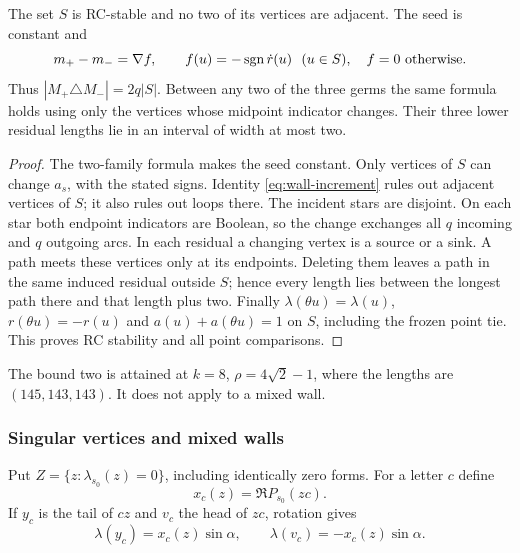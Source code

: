 \begin{theorem}\label{thm:regular-wall}
The set $S$ is RC-stable and no two of its vertices are adjacent.
The seed is constant and
\[
 m_+-m_-=\nabla f,\qquad
 f(u)=-\operatorname{sgn}\dot r(u)\ \ (u\in S),\quad f=0\ \text{otherwise}.
\]
Thus $|M_+\triangle M_-|=2q|S|$. Between any two of the three
germs the same formula holds using only the vertices whose midpoint
indicator changes. Their three lower residual lengths lie in an
interval of width at most two.
\end{theorem}
\begin{proof}
The two-family formula makes the seed constant. Only vertices of $S$
can change $a_s$, with the stated signs. Identity
\eqref{eq:wall-increment} rules out adjacent vertices of $S$; it also
rules out loops there. The incident stars are disjoint. On each star
both endpoint indicators are Boolean, so the change exchanges all
$q$ incoming and $q$ outgoing arcs. In each residual a changing
vertex is a source or a sink. A path meets these vertices only at
its endpoints. Deleting them leaves a path in the same induced
residual outside $S$; hence every length lies between the longest
path there and that length plus two. Finally
$\lambda(\theta u)=\lambda(u)$, $r(\theta u)=-r(u)$ and
$a(u)+a(\theta u)=1$ on $S$, including the frozen point tie.
This proves RC stability and all point comparisons.
\end{proof}
The bound two is attained at $k=8$, $\rho=4\sqrt2-1$, where the
lengths are $(145,143,143)$. It does not apply to a mixed wall.

\subsubsection{Singular vertices and mixed walls}
Put $Z=\{z:\lambda_{s_0}(z)=0\}$, including identically zero forms.
For a letter $c$ define
\[
 x_c(z)=\Re P_{s_0}(zc).
\]
If $y_c$ is the tail of $cz$ and $v_c$ the head of $zc$, rotation gives
\[
 \lambda(y_c)=x_c(z)\sin\alpha,\qquad
 \lambda(v_c)=-x_c(z)\sin\alpha.                     \tag{W1}
\]

